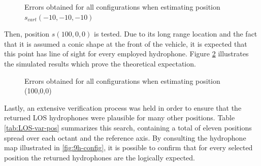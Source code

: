\begin{figure}[!htbp]
	\captionsetup{justification=centering,margin=2cm}
	\caption{Errors obtained for all configurations when estimating position $s_{cart}(-10,-10,-10)$}
	\label{fig:errors-10-10-10}
\end{figure}

Then, position $s(100,0,0)$ is tested. Due to its long range location and the fact that it is assumed a conic shape at the front of the vehicle, it is expected that this point has line of sight for every employed hydrophone. Figure \ref{fig:errors-100-0-0} illustrates the simulated results which prove the theoretical expectation.

\begin{figure}[!htbp]
	\captionsetup{justification=centering,margin=2cm}
	\caption{Errors obtained for all configurations when estimating position (100,0,0)}
	\label{fig:errors-100-0-0}
\end{figure}

Lastly, an extensive verification process was held in order to ensure that the returned LOS hydrophones were plausible for many other positions. Table \ref{tab:LOS-var-pos} summarizes this search, containing a total of eleven positions spread over each octant and the reference axis. By consulting the hydrophone map illustrated in \ref{fig:9h-config}, it is possible to confirm that for every selected position the returned hydrophones are the logically expected.


